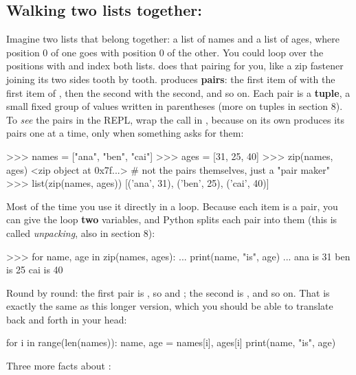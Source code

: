 \documentclass[10pt,a4paper]{article}
\begin{document}
\subsection{Walking two lists together: }
Imagine two lists that belong together: a list of names and a list of ages, where position 0 of one goes with position 0 of the other. You could loop over the positions with  and index both lists.  does that pairing for you, like a zip fastener joining its two sides tooth by tooth.
 produces \textbf{pairs}: the first item of  with the first item of , then the second with the second, and so on. Each pair is a \textbf{tuple}, a small fixed group of values written in parentheses (more on tuples in section 8). To \emph{see} the pairs in the REPL, wrap the call in , because  on its own produces its pairs one at a time, only when something asks for them:
\begin{txtcode}
>>> names = ["ana", "ben", "cai"]
>>> ages = [31, 25, 40]
>>> zip(names, ages)
<zip object at 0x7f...>            # not the pairs themselves, just a "pair maker"
>>> list(zip(names, ages))
[('ana', 31), ('ben', 25), ('cai', 40)]
\end{txtcode}
Most of the time you use it directly in a  loop. Because each item is a pair, you can give the loop \textbf{two} variables, and Python splits each pair into them (this is called \emph{unpacking}, also in section 8):
\begin{txtcode}
>>> for name, age in zip(names, ages):
...     print(name, "is", age)
...
ana is 31
ben is 25
cai is 40
\end{txtcode}
Round by round: the first pair is , so  and ; the second is , and so on. That is exactly the same as this longer version, which you should be able to translate back and forth in your head:
\begin{pycode}
for i in range(len(names)):
    name, age = names[i], ages[i]
    print(name, "is", age)
\end{pycode}
Three more facts about :
\end{document}
